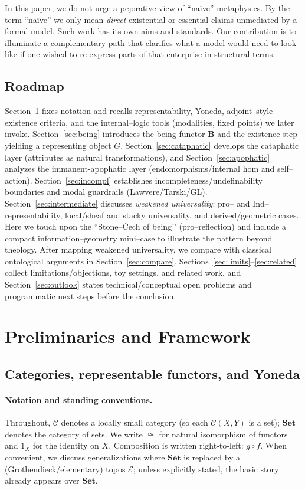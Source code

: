 \documentclass[11pt]{article}
\theoremstyle{upright}
\begin{document}
In this paper, we do not urge a pejorative view of “naïve” metaphysics. By the term “naïve” we only mean \emph{direct} existential or essential claims unmediated by a formal model. Such work has its own aims and standards. Our contribution is to illuminate a complementary path that clarifies what a model would need to look like if one wished to re-express parts of that enterprise in structural terms.

\subsection{Roadmap}
Section~\ref{sec:prelims} fixes notation and recalls representability, Yoneda, adjoint–style existence criteria, and the internal–logic tools (modalities, fixed points) we later invoke. Section~\ref{sec:being} introduces the being functor \(\mathbf B\) and the existence step yielding a representing object \(G\). Section~\ref{sec:cataphatic} develops the cataphatic layer (attributes as natural transformations), and Section~\ref{sec:apophatic} analyzes the immanent-apophatic layer (endomorphisms/internal hom and self–action). Section~\ref{sec:incompl} establishes incompleteness/undefinability boundaries and modal guardrails (Lawvere/Tarski/GL). Section~\ref{sec:intermediate} discusses \emph{weakened universality}: pro– and Ind–representability, local/sheaf and stacky universality, and derived/geometric cases. Here we touch upon the “Stone–Čech of being’’  (pro–reflection) and include a compact information–geometry mini–case to illustrate the pattern beyond theology.  After mapping weakened universality, we compare with classical ontological arguments in Section~\ref{sec:compare}. Sections~\ref{sec:limits}–\ref{sec:related} collect limitations/objections, toy settings, and related work, and Section~\ref{sec:outlook} states technical/conceptual open problems and programmatic next steps before the conclusion.

\section{Preliminaries and Framework}\label{sec:prelims}

\subsection{Categories, representable functors, and Yoneda}
\paragraph{Notation and standing conventions.}
Throughout, \(\mathcal C\) denotes a locally small category (so each \(\mathcal C(X,Y)\) is a set); \(\mathbf{Set}\) denotes the category of sets. We write \(\cong\) for natural isomorphism of functors and \(1_X\) for the identity on \(X\). Composition is written right-to-left: \(g\circ f\).
When convenient, we discuss generalizations where \(\mathbf{Set}\) is replaced by a (Grothendieck/elementary) topos \(\mathcal E\); unless explicitly stated, the basic story already appears over \(\mathbf{Set}\).
\end{document}
